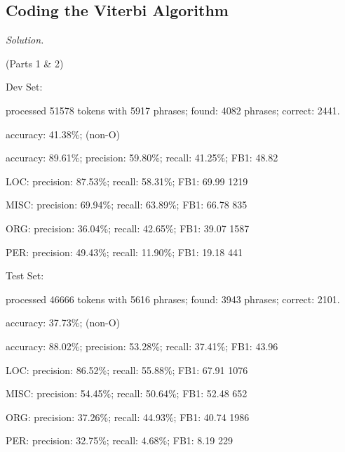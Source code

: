 \documentclass[12pt]{article}
\newcommand\sol[1]{\begin{mdframed}
\emph{Solution.} #1
\end{mdframed}}
\begin{document}
\subsection{Coding the Viterbi Algorithm}

\sol{
\item (Parts 1 \& 2)

\item Dev Set:

\item processed 51578 tokens with 5917 phrases; found: 4082 phrases; correct: 2441.
\item accuracy:  41.38\%; (non-O)
\item accuracy:  89.61\%; precision:  59.80\%; recall:  41.25\%; FB1:  48.82
\item LOC: precision:  87.53\%; recall:  58.31\%; FB1:  69.99  1219
\item MISC: precision:  69.94\%; recall:  63.89\%; FB1:  66.78  835
\item ORG: precision:  36.04\%; recall:  42.65\%; FB1:  39.07  1587
\item PER: precision:  49.43\%; recall:  11.90\%; FB1:  19.18  441

\item 

\item Test Set:
\item processed 46666 tokens with 5616 phrases; found: 3943 phrases; correct: 2101.
\item accuracy:  37.73\%; (non-O)
\item accuracy:  88.02\%; precision:  53.28\%; recall:  37.41\%; FB1:  43.96
\item LOC: precision:  86.52\%; recall:  55.88\%; FB1:  67.91  1076
\item MISC: precision:  54.45\%; recall:  50.64\%; FB1:  52.48  652
\item ORG: precision:  37.26\%; recall:  44.93\%; FB1:  40.74  1986
\item PER: precision:  32.75\%; recall:   4.68\%; FB1:   8.19  229

}
\end{document}

